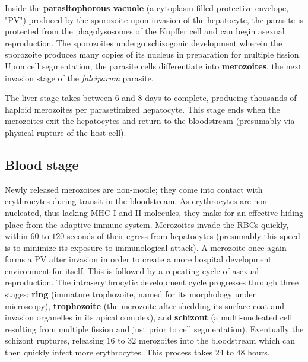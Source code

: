 Inside the \textbf{parasitophorous vacuole} (a cytoplasm-filled protective envelope, "PV") produced by the sporozoite upon invasion of the hepatocyte, the parasite is protected from the phagolysosomes of the Kupffer cell and can begin asexual reproduction\cite{Lingelbach:1998us}.  The sporozoites undergo schizogonic development wherein the sporozoite produces many copies of its nucleus in preparation for multiple fission.  Upon cell segmentation, the parasite cells differentiate into \textbf{merozoites}, the next invasion stage of the \textit{falciparum} parasite.

The liver stage takes between $6$ and $8$ days\cite{Bousema:2014cy} to complete, producing thousands of haploid merozoites per parasetimized hepatocyte\cite{Prudencio:2006ho}.  This stage ends when the merozoites exit the hepatocytes and return to the bloodstream (presumably via physical rupture of the host cell).  
\subsection{Blood stage}

Newly released merozoites are non-motile; they come into contact with erythrocytes during transit in the bloodstream.  As erythrocytes are non-nucleated, thus lacking MHC I and II molecules, they make for an effective hiding place from the adaptive immune system\cite{Murphy:2011vw}.  Merozoites invade the RBCs quickly, within $60$ to $120$ seconds of their egress from hepatocytes\cite{Cowman:2006eu,Wright:2014ii} (presumably this speed is to minimize its exposure to immunological attack).  A merozoite once again forms a PV after invasion in order to create a more hospital development environment for itself.  This is followed by a repeating cycle of asexual reproduction.  The intra-erythrocytic development cycle progresses through three stages: \textbf{ring} (immature trophozoite, named for its morphology under microscopy), \textbf{trophozoite} (the merozoite after shedding its surface coat and invasion organelles in its apical complex), and \textbf{schizont} (a multi-nucleated cell resulting from multiple fission and just prior to cell segmentation)\cite{Josling:2015js}.  Eventually the schizont ruptures, releasing $16$ to $32$ merozoites into the bloodstream which can then quickly infect more erythrocytes.  This process takes $24$ to $48$ hours.


